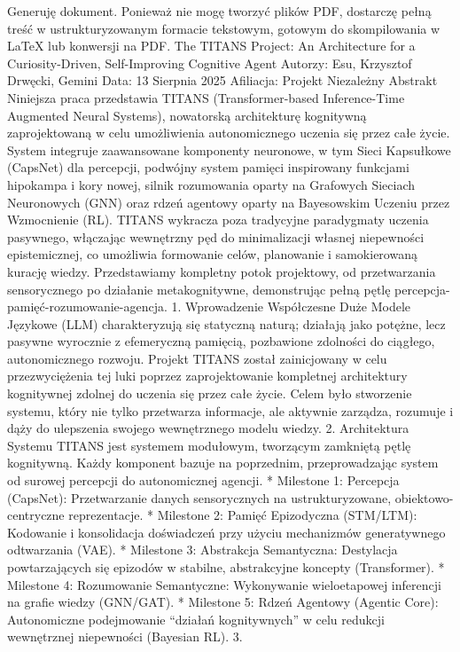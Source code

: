 \documentclass[letterpaper,twocolumn]{article}
\author{}
\date{}
\begin{document}
Generuję dokument. Ponieważ nie mogę tworzyć plików PDF, dostarczę pełną
treść w ustrukturyzowanym formacie tekstowym, gotowym do skompilowania w
LaTeX lub konwersji na PDF. The TITANS Project: An Architecture for a
Curiosity-Driven, Self-Improving Cognitive Agent Autorzy: Esu, Krzysztof
Drwęcki, Gemini Data: 13 Sierpnia 2025 Afiliacja: Projekt Niezależny
Abstrakt Niniejsza praca przedstawia TITANS (Transformer-based
Inference-Time Augmented Neural Systems), nowatorską architekturę
kognitywną zaprojektowaną w celu umożliwienia autonomicznego uczenia się
przez całe życie. System integruje zaawansowane komponenty neuronowe, w
tym Sieci Kapsułkowe (CapsNet) dla percepcji, podwójny system pamięci
inspirowany funkcjami hipokampa i kory nowej, silnik rozumowania oparty
na Grafowych Sieciach Neuronowych (GNN) oraz rdzeń agentowy oparty na
Bayesowskim Uczeniu przez Wzmocnienie (RL). TITANS wykracza poza
tradycyjne paradygmaty uczenia pasywnego, włączając wewnętrzny pęd do
minimalizacji własnej niepewności epistemicznej, co umożliwia formowanie
celów, planowanie i samokierowaną kurację wiedzy. Przedstawiamy
kompletny potok projektowy, od przetwarzania sensorycznego po działanie
metakognitywne, demonstrując pełną pętlę
percepcja-pamięć-rozumowanie-agencja. 1. Wprowadzenie Współczesne Duże
Modele Językowe (LLM) charakteryzują się statyczną naturą; działają jako
potężne, lecz pasywne wyrocznie z efemeryczną pamięcią, pozbawione
zdolności do ciągłego, autonomicznego rozwoju. Projekt TITANS został
zainicjowany w celu przezwyciężenia tej luki poprzez zaprojektowanie
kompletnej architektury kognitywnej zdolnej do uczenia się przez całe
życie. Celem było stworzenie systemu, który nie tylko przetwarza
informacje, ale aktywnie zarządza, rozumuje i dąży do ulepszenia swojego
wewnętrznego modelu wiedzy. 2. Architektura Systemu TITANS jest systemem
modułowym, tworzącym zamkniętą pętlę kognitywną. Każdy komponent bazuje
na poprzednim, przeprowadzając system od surowej percepcji do
autonomicznej agencji. * Milestone 1: Percepcja (CapsNet): Przetwarzanie
danych sensorycznych na ustrukturyzowane, obiektowo-centryczne
reprezentacje. * Milestone 2: Pamięć Epizodyczna (STM/LTM): Kodowanie i
konsolidacja doświadczeń przy użyciu mechanizmów generatywnego
odtwarzania (VAE). * Milestone 3: Abstrakcja Semantyczna: Destylacja
powtarzających się epizodów w stabilne, abstrakcyjne koncepty
(Transformer). * Milestone 4: Rozumowanie Semantyczne: Wykonywanie
wieloetapowej inferencji na grafie wiedzy (GNN/GAT). * Milestone 5:
Rdzeń Agentowy (Agentic Core): Autonomiczne podejmowanie ``działań
kognitywnych'' w celu redukcji wewnętrznej niepewności (Bayesian RL). 3.
\end{document}
